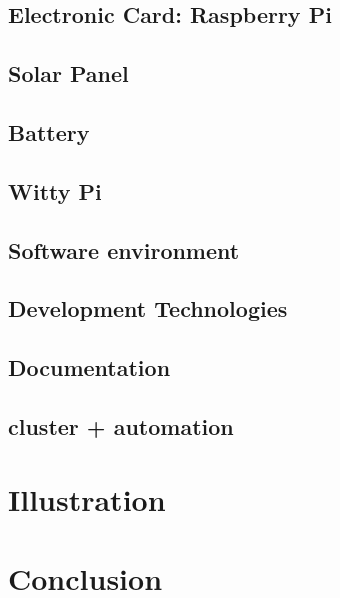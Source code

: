 

        \subsection{Electronic Card: Raspberry Pi}
        \subsection{Solar Panel}
        \subsection{Battery}
        \subsection{Witty Pi}
    \subsection{Software environment}
        \subsection{Development Technologies}
        \subsection{Documentation}

    \subsection{cluster + automation}

\section{Illustration}

\section{Conclusion}

